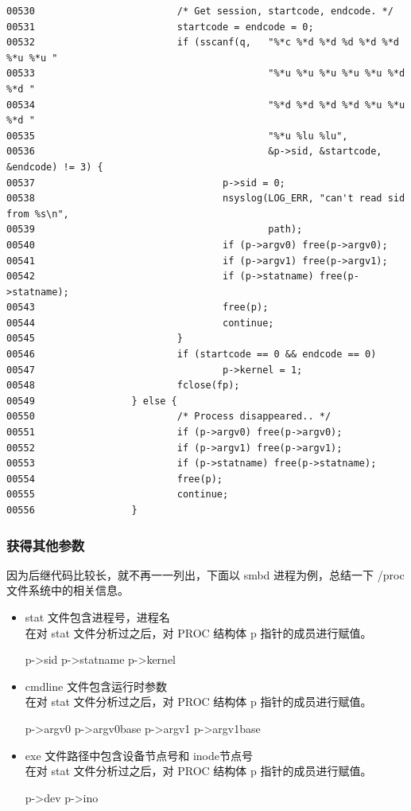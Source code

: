 {\begin{shaded}\begin{verbatim}
00530                         /* Get session, startcode, endcode. */
00531                         startcode = endcode = 0;
00532                         if (sscanf(q,   "%*c %*d %*d %d %*d %*d %*u %*u "
00533                                         "%*u %*u %*u %*u %*u %*d %*d "
00534                                         "%*d %*d %*d %*d %*u %*u %*d "
00535                                         "%*u %lu %lu",
00536                                         &p->sid, &startcode, &endcode) != 3) {
00537                                 p->sid = 0;
00538                                 nsyslog(LOG_ERR, "can't read sid from %s\n",
00539                                         path);
00540                                 if (p->argv0) free(p->argv0);
00541                                 if (p->argv1) free(p->argv1);
00542                                 if (p->statname) free(p->statname);
00543                                 free(p);
00544                                 continue;
00545                         }
00546                         if (startcode == 0 && endcode == 0)
00547                                 p->kernel = 1;
00548                         fclose(fp);
00549                 } else {
00550                         /* Process disappeared.. */
00551                         if (p->argv0) free(p->argv0);
00552                         if (p->argv1) free(p->argv1);
00553                         if (p->statname) free(p->statname);
00554                         free(p);
00555                         continue;
00556                 }
\end{verbatim}\end{shaded}}
\subsubsection{获得其他参数}

因为后继代码比较长，就不再一一列出，下面以 smbd 进程为例，总结一下 /proc
文件系统中的相关信息。

\begin{itemize}
\item
  stat 文件包含进程号，进程名\\在对 stat 文件分析过之后，对 PROC 结构体 p
  指针的成员进行赋值。

  p-\textgreater{}sid p-\textgreater{}statname p-\textgreater{}kernel
\item
  cmdline 文件包含运行时参数\\在对 stat 文件分析过之后，对 PROC 结构体 p
  指针的成员进行赋值。

  p-\textgreater{}argv0 p-\textgreater{}argv0base p-\textgreater{}argv1
  p-\textgreater{}argv1base
\item
  exe 文件路径中包含设备节点号和 inode节点号\\在对 stat
  文件分析过之后，对 PROC 结构体 p 指针的成员进行赋值。

  p-\textgreater{}dev p-\textgreater{}ino
\end{itemize}
